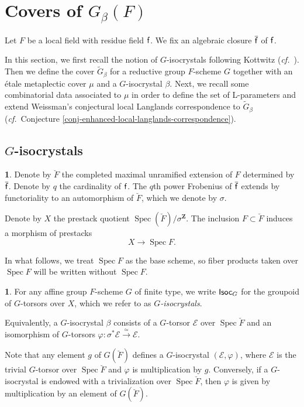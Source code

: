 \documentclass[10pt,english,reqno]{amsart}
\newcommand{\integers}{\mathbf Z}
\newcommand{\residue}{\textnormal{\textsf{f}}}
\newcommand{\Isoc}{\textnormal{\textsf{Isoc}}}
\newcommand{\Spec}{\operatorname{Spec}}
\theoremstyle{definition}
\numberwithin{equation}{section}
\newtheorem{untitledsubsubsection}[subsubsection]{}
\newenvironment{void}
{\begin{untitledsubsubsection}}
{\end{untitledsubsubsection}}
\begin{document}


\medskip




\section{Covers of $G_{\beta}(F)$}

Let $F$ be a local field with residue field $\residue$. We fix an algebraic closure $\overline{\residue}$ of $\residue$.

In this section, we first recall the notion of $G$-isocrystals following Kottwitz (\emph{cf.}~\cite{MR809866, MR1485921}). Then we define the cover $\widetilde G_{\beta}$ for a reductive group $F$-scheme $G$ together with an \'etale metaplectic cover $\mu$ and a $G$-isocrystal $\beta$. Next, we recall some combinatorial data associated to $\mu$ in order to define the set of L-parameters and extend Weissman's conjectural local Langlands correspondence to $\widetilde G_{\beta}$  (\emph{cf.}~Conjecture \ref{conj-enhanced-local-langlands-correspondence}).

\subsection{$G$-isocrystals}

\begin{void}
Denote by $\breve F$ the completed maximal unramified extension of $F$ determined by $\overline{\residue}$. Denote by $q$ the cardinality of $\residue$. The $q$th power Frobenius of $\overline{\residue}$ extends by functoriality to an automorphism of $\breve F$, which we denote by $\sigma$.

Denote by $X$ the prestack quotient $\Spec(\breve F)/\sigma^{\integers}$. The inclusion $F \subset \breve F$ induces a morphism of prestacks
\begin{equation}
\label{eq-unramified-quotient-to-local-field}
	X \rightarrow \Spec F.
\end{equation}

In what follows, we treat $\Spec F$ as the base scheme, so fiber products taken over $\Spec F$ will be written without $\Spec F$.
\end{void}


\begin{void}
For any affine group $F$-scheme $G$ of finite type, we write $\Isoc_G$ for the groupoid of $G$-torsors over $X$, which we refer to as \emph{$G$-isocrystals}.

Equivalently, a $G$-isocrystal $\beta$ consists of a $G$-torsor $\mathscr E$ over $\Spec\breve F$ and an isomorphism of $G$-torsors $\varphi : \sigma^*\mathscr E \xrightarrow{\simeq} \mathscr E$.

Note that any element $g$ of $G(\breve F)$ defines a $G$-isocrystal $(\mathscr E, \varphi)$, where $\mathscr E$ is the trivial $G$-torsor over $\Spec \breve F$ and $\varphi$ is multiplication by $g$. Conversely, if a $G$-isocrystal is endowed with a trivialization over $\Spec \breve F$, then $\varphi$ is given by multiplication by an element of $G(\breve F)$.
\end{void}
\end{document}
